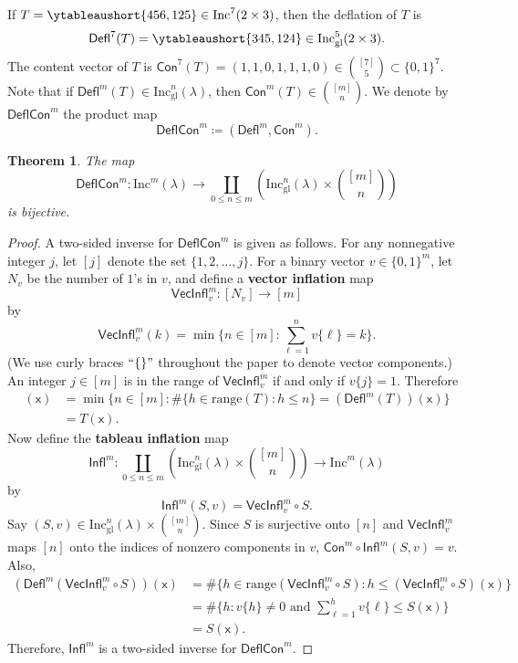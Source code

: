 \documentclass[12pt]{amsart}
\newcommand{\x}{\ensuremath{\mathsf{x}}}
\newtheorem{theorem}{Theorem}[section]
\theoremstyle{definition}
\newenvironment{example}
  {\pushQED{\qed}\renewcommand{\qedsymbol}{$\diamondsuit$}\examplex}
  {\popQED\endexamplex}
\theoremstyle{remark}
\numberwithin{equation}{section}
\newcommand{\inc}{\ensuremath{\mathrm{Inc}}}
\newcommand{\incgl}{\inc_{\mathrm{gl}}}
\newcommand{\deflate}{\ensuremath{\mathsf{Defl}}}
\newcommand{\inflate}{\ensuremath{\mathsf{VecInfl}}}
\newcommand{\tinflate}{\ensuremath{\mathsf{Infl}}}
\newcommand{\content}{\ensuremath{\mathsf{Con}}}
\newcommand{\compress}{\ensuremath{\mathsf{DeflCon}}}
\begin{document}
\begin{example}\label{ex:deflate}
If $T = \ytableaushort{456,125} \in \inc^7(2 \times 3)$, then the deflation of $T$ is \[\deflate^7(T) = \ytableaushort{345,124} \in \incgl^5(2 \times 3).\] The content vector of $T$ is $\content^7(T) = (1,1,0,1,1,1,0) \in \binom{[7]}{5} \subset \{0,1\}^7$.
\end{example}
Note that if $\deflate^m(T) \in \incgl^n(\lambda)$, then $\content^m(T) \in \binom{[m]}{n}$. We denote by $\compress^m$ the product map
\[
\compress^m \coloneqq (\deflate^m,\content^m).
\] 
\begin{theorem}\label{thm:compressbijective} The map 
\[
\compress^m : \inc^m(\lambda) \to \coprod_{0 \leq n \leq m} \left( \incgl^n(\lambda) \times \binom{[m]}{n} \right)
\]
 is bijective.
\end{theorem}
\begin{proof}
A two-sided inverse for $\compress^m$ is given as follows. For any nonnegative integer $j$, let $[j]$ denote the set $\{1, 2, \dots, j\}$.
For a binary vector $v \in \{0,1\}^m$, let $N_v$ be the number of $1$'s in $v$, and define a {\bf vector inflation} map \[\inflate^m_v : [N_v] \to [m]\] by
\[ \inflate^m_v(k) = \min \bigg\lbrace n \in [m]:   \sum_{\ell = 1}^n v\lbrace \ell \rbrace = k \bigg\rbrace.\] (We use curly braces $``\{\}"$ throughout the paper to denote vector components.) An integer $j \in [m]$ is in the range of $\inflate^m_v$ if and only if $v\lbrace j \rbrace = 1$. Therefore
\begin{align*}
[\inflate^m_{\content^m(T)} \circ \deflate^m(T)](\x) &= \min \bigg\lbrace n \in [m]:    \# \{ h \in \mathrm{range}(T): h \leq n \} = (\deflate^m(T))(\x) \bigg\rbrace \\ &= T(\x). 
\end{align*} Now define the {\bf tableau inflation} map 
\[
\tinflate^m : \coprod_{0 \leq n \leq m} \left( \incgl^n(\lambda) \times \binom{[m]}{n} \right) \to \inc^m(\lambda)
\] 
by 
\[
\tinflate^m(S,v) = \inflate^m_v \circ S.
\]
Say $(S,v) \in \incgl^n(\lambda) \times \binom{[m]}{n}$. Since $S$ is surjective onto $[n]$ and $\inflate^m_v$ maps $[n]$ onto the indices of nonzero components in $v$, $\content^m \circ \tinflate^m(S,v) = v$.  Also,
\begin{align*}
 (\deflate^m(\inflate^m_v \circ S))(\x) &= \# \{ h \in \mathrm{range}(\inflate^m_v \circ S): h \leq (\inflate^m_v \circ S)(\x) \} \\  
 &= \# \{ h: v\{h\} \neq 0 \text{ and } \sum_{\ell = 1}^h v\{\ell\} \leq S(\x)  \} \\
 &= S(\x).
\end{align*}
Therefore, $\tinflate^m$ is a two-sided inverse for $\compress^m$.
\end{proof} 
\end{document}
